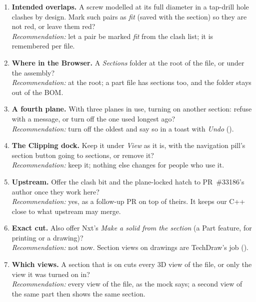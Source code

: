 \begin{enumerate}
        \emph{Recommendation:} both, off by default.
  \item \textbf{Intended overlaps.} A screw modelled at its full diameter in a tap-drill hole clashes by design. Mark
        such pairs as \emph{fit} (saved with the section) so they are not red, or leave them red?\\
        \emph{Recommendation:} let a pair be marked \emph{fit} from the clash list; it is remembered per file.
  \item \textbf{Where in the Browser.} A \emph{Sections} folder at the root of the file, or under the assembly?\\
        \emph{Recommendation:} at the root; a part file has sections too, and the folder stays out of the BOM.
  \item \textbf{A fourth plane.} With three planes in use, turning on another section: refuse with a message, or turn
        off the one used longest ago?\\
        \emph{Recommendation:} turn off the oldest and say so in a toast with \emph{Undo} ().
  \item \textbf{The Clipping dock.} Keep it under \emph{View} as it is, with the navigation pill's section button
        going to sections, or remove it?\\
        \emph{Recommendation:} keep it; nothing else changes for people who use it.
  \item \textbf{Upstream.} Offer the clash bit and the plane-locked hatch to PR~\#33186's author once they work
        here?\\
        \emph{Recommendation:} yes, as a follow-up PR on top of theirs. It keeps our C++ close to what upstream may
        merge.
  \item \textbf{Exact cut.} Also offer Nxt's \emph{Make a solid from the section} (a Part feature, for printing or a
        drawing)?\\
        \emph{Recommendation:} not now. Section views on drawings are TechDraw's job ().
  \item \textbf{Which views.} A section that is on cuts every 3D view of the file, or only the view it was turned on
        in?\\
        \emph{Recommendation:} every view of the file, as the mock says; a second view of the same part then shows
        the same section.
\end{enumerate}

